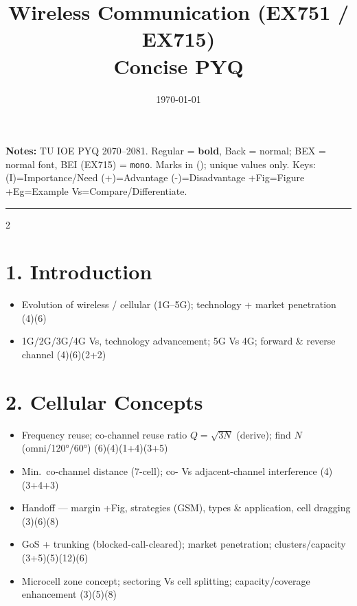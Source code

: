 \documentclass[10pt]{article}
\title{Wireless Communication (EX751 / EX715)\\[0.3em]\large Concise PYQ}
\author{}
\date{\today}
\begin{document}
\maketitle
\vspace{-1em}
\small
\textbf{Notes:} TU IOE PYQ 2070--2081. Regular = \textbf{bold}, Back = normal; BEX = normal font, BEI (EX715) = \texttt{mono}.
Marks in (); unique values only.
Keys: (I)=Importance/Need \quad (+)=Advantage \quad (-)=Disadvantage \quad +Fig=Figure \quad +Eg=Example \quad Vs=Compare/Differentiate.
\vspace{2pt}
\hrule
\vspace{4pt}

\begin{multicols}{2}
\footnotesize

\section*{1. Introduction}
\begin{itemize}
  \item Evolution of wireless / cellular (1G--5G); technology + market penetration \hfill (4)(6)
  \item 1G/2G/3G/4G Vs, technology advancement; 5G Vs 4G; forward \& reverse channel \hfill (4)(6)(2+2)
\end{itemize}

\section*{2. Cellular Concepts}
\begin{itemize}
  \item Frequency reuse; co-channel reuse ratio $Q{=}\sqrt{3N}$ (derive); find $N$ (omni/120°/60°) \hfill (6)(4)(1+4)(3+5)
  \item Min.\ co-channel distance (7-cell); co- Vs adjacent-channel interference \hfill (4)(3+4+3)
  \item Handoff --- margin +Fig, strategies (GSM), types \& application, cell dragging \hfill (3)(6)(8)
  \item GoS + trunking (blocked-call-cleared); market penetration; clusters/capacity \hfill (3+5)(5)(12)(6)
  \item Microcell zone concept; sectoring Vs cell splitting; capacity/coverage enhancement \hfill (3)(5)(8)
\end{itemize}


\end{multicols}
\end{document}
